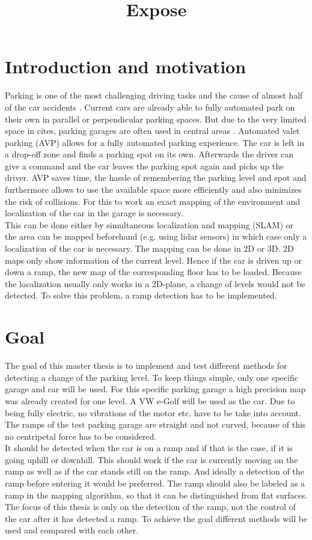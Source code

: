 \documentclass{paper}
\title{Expose}
\begin{document}
\maketitle

\section{Introduction and motivation}
Parking is one of the most challenging driving tasks and the cause of almost half of the car accidents \cite{accident}. Current cars are already able to fully automated park on their own in parallel or perpendicular parking spaces. But due to the very limited space in cites, parking garages are often used in central areas \cite{7995971}. Automated valet parking (AVP) allows for a fully automated parking experience. The car is left in a drop-off zone and finds a parking spot on its own. Afterwards the driver can give a command and the car leaves the parking spot again and picks up the driver. AVP saves time, the hassle of remembering the parking level and spot and furthermore allows to use the available space more efficiently and also minimizes the risk of collisions. For this to work an exact mapping of the environment and localization of the car in the garage is necessary.\\
This can be done either by simultaneous localization and mapping (SLAM) or the area can be mapped beforehand (e.g. using lidar sensors) in which case only a localization of the car is necessary.
The mapping can be done in 2D or 3D. 2D maps only show information of the current level. Hence if the car is driven up or down a ramp, the new map of the corresponding floor has to be loaded. Because the localization usually only works in a 2D-plane, a change of levels would not be detected. To solve this problem, a ramp detection has to be implemented. 

\section{Goal}
The goal of this master thesis is to implement and test different methods for detecting a change of the parking level. To keep things simple, only one specific garage and car will be used. For this specific parking garage a high precision map was already created for one level. A VW e-Golf will be used as the car. Due to being fully electric, no vibrations of the motor etc. have to be take into account. The ramps of the test parking garage are straight and not curved, because of this no centripetal force has to be considered.\\
It should be detected when the car is on a ramp and if that is the case, if it is going uphill or downhill. This should work if the car is currently moving on the ramp as well as if the car stands still on the ramp. And ideally a detection of the ramp before entering it would be preferred.  
The ramp should also be labeled as a ramp in the mapping algorithm, so that it can be distinguished from flat surfaces.
The focus of this thesis is only on the detection of the ramp, not the control of the car after it has detected a ramp.
To achieve the goal different methods will be used and compared with each other.
\end{document}
